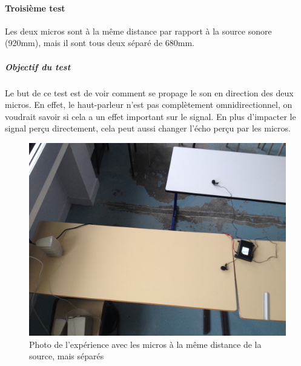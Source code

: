  \paragraph{Troisième test} 
 Les deux micros sont à la même distance par rapport à la source sonore (920mm), mais il sont tous deux séparé de 680mm.
 \subparagraph{Objectif du test}
 Le but de ce test est de voir comment se propage le son en direction des deux micros. En effet, le haut-parleur n'est pas complètement omnidirectionnel, on voudrait savoir si cela a un effet important sur le signal. En plus d'impacter le signal perçu directement, cela peut aussi changer l'écho perçu par les micros. 
 \begin{figure}[H]
 \includegraphics[width=\textwidth]{../tests/lecture_de_signaux_carres/donnees11-03/test_3.jpg} 
 \caption{Photo de l'expérience avec les micros à la même distance de la source, mais séparés}
 \end{figure}
 
